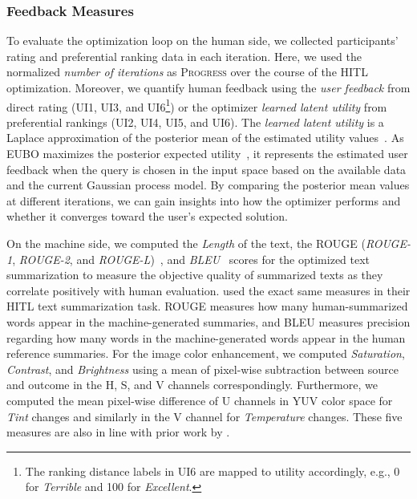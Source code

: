\documentclass[acmsmall,screen,nonacm]{acmart}
\begin{document}
\subsubsection{Feedback Measures}
\label{sec:feedback-measures}
To evaluate the optimization loop on the human side, we collected participants' rating and preferential ranking data in each iteration. Here, we used the normalized \emph{number of iterations} as \textsc{Progress} over the course of the HITL optimization. Moreover, we quantify human feedback using the \emph{user feedback} from direct rating  (UI1, UI3, and UI6\footnote{The ranking distance labels in UI6 are mapped to utility accordingly, e.g., 0 for \emph{Terrible} and 100 for \emph{Excellent}.}) or the optimizer \emph{learned latent utility} from preferential rankings (UI2, UI4, UI5, and UI6).
%
The \emph{learned latent utility} is a Laplace approximation of the posterior mean of the estimated utility values~\cite{chu2005preference}.
As EUBO maximizes the posterior expected utility~\cite{lin2022preference}, it represents the estimated user feedback when the query is chosen in the input space based on the available data and the current Gaussian process model. By comparing the posterior mean values at different iterations, we can gain insights into how the optimizer performs and whether it converges toward the user's expected solution.

On the machine side, we computed the \emph{Length} of the text, the ROUGE (\emph{ROUGE-1}, \emph{ROUGE-2}, and \emph{ROUGE-L})~\cite{lin2004rouge}, and \emph{BLEU}~\cite{papineni2002bleu} scores for the optimized text summarization to measure the objective quality of summarized texts as they correlate positively with human evaluation. \citet{ou2023expertise} used the exact same measures in their HITL text summarization task. ROUGE measures how many human-summarized words appear in the machine-generated summaries, and BLEU measures precision regarding how many words in the machine-generated words appear in the human reference summaries. 
For the image color enhancement, we computed \emph{Saturation}, \emph{Contrast}, and \emph{Brightness} using a mean of pixel-wise subtraction between source and outcome in the H, S, and V channels correspondingly. Furthermore, we computed the mean pixel-wise difference of U channels in YUV color space for \emph{Tint} changes and similarly in the V channel for \emph{Temperature} changes. These five measures are also in line with prior work by \citet{ou2023expertise}.
\end{document}
